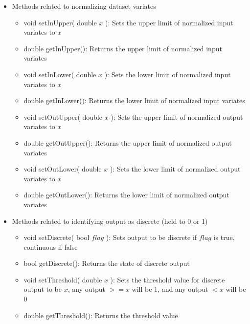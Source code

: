 \documentclass{report}
\def\beginred{\color{red}}
\def\endcolor{\color{black}}
\begin{document}
\begin{itemize}
\begin{itemize}
\item Methods related to normalizing dataset variates
\begin{itemize}
\item void setInUpper( double $x$ ): Sets the upper limit of
      normalized input variates to $x$
\item double getInUpper(): Returns the upper limit of normalized input
      variates
\item void setInLower( double $x$ ): Sets the lower limit of
      normalized input variates to $x$
\item double getInLower(): Returns the lower limit of normalized input
      variates
\item void setOutUpper( double $x$ ): Sets the upper limit of
      normalized output variates to $x$
\item double getOutUpper(): Returns the upper limit of normalized
      output variates
\item void setOutLower( double $x$ ): Sets the lower limit of
      normalized output variates to $x$
\item double getOutLower(): Returns the lower limit of normalized
      output variates
\end{itemize}

\item Methods related to identifying output as discrete (held to 0 or
      1)
\begin{itemize}
\item void setDiscrete( bool $flag$ ): Sets output to be discrete if
      $flag$ is true, continuous if false
\item \beginred bool getDiscrete(): Returns the state of discrete
      output \endcolor
\item void setThreshold( double $x$ ): Sets the threshold value for
      discrete output to be $x$, any output $>= x$ will be 1, and any
      output $< x$ will be 0
\item double getThreshold(): Returns the threshold value
\end{itemize}


\end{itemize}
\end{itemize}
\end{document}
